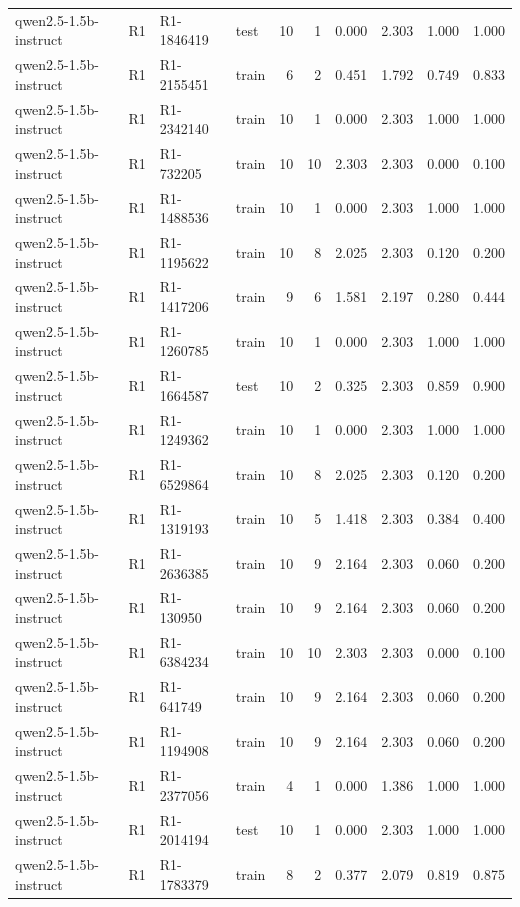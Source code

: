 \begin{table}
\begin{tabular}{llllrrrrrr}
qwen2.5-1.5b-instruct & R1 & R1-1846419 & test & 10 & 1 & 0.000 & 2.303 & 1.000 & 1.000 \\
qwen2.5-1.5b-instruct & R1 & R1-2155451 & train & 6 & 2 & 0.451 & 1.792 & 0.749 & 0.833 \\
qwen2.5-1.5b-instruct & R1 & R1-2342140 & train & 10 & 1 & 0.000 & 2.303 & 1.000 & 1.000 \\
qwen2.5-1.5b-instruct & R1 & R1-732205 & train & 10 & 10 & 2.303 & 2.303 & 0.000 & 0.100 \\
qwen2.5-1.5b-instruct & R1 & R1-1488536 & train & 10 & 1 & 0.000 & 2.303 & 1.000 & 1.000 \\
qwen2.5-1.5b-instruct & R1 & R1-1195622 & train & 10 & 8 & 2.025 & 2.303 & 0.120 & 0.200 \\
qwen2.5-1.5b-instruct & R1 & R1-1417206 & train & 9 & 6 & 1.581 & 2.197 & 0.280 & 0.444 \\
qwen2.5-1.5b-instruct & R1 & R1-1260785 & train & 10 & 1 & 0.000 & 2.303 & 1.000 & 1.000 \\
qwen2.5-1.5b-instruct & R1 & R1-1664587 & test & 10 & 2 & 0.325 & 2.303 & 0.859 & 0.900 \\
qwen2.5-1.5b-instruct & R1 & R1-1249362 & train & 10 & 1 & 0.000 & 2.303 & 1.000 & 1.000 \\
qwen2.5-1.5b-instruct & R1 & R1-6529864 & train & 10 & 8 & 2.025 & 2.303 & 0.120 & 0.200 \\
qwen2.5-1.5b-instruct & R1 & R1-1319193 & train & 10 & 5 & 1.418 & 2.303 & 0.384 & 0.400 \\
qwen2.5-1.5b-instruct & R1 & R1-2636385 & train & 10 & 9 & 2.164 & 2.303 & 0.060 & 0.200 \\
qwen2.5-1.5b-instruct & R1 & R1-130950 & train & 10 & 9 & 2.164 & 2.303 & 0.060 & 0.200 \\
qwen2.5-1.5b-instruct & R1 & R1-6384234 & train & 10 & 10 & 2.303 & 2.303 & 0.000 & 0.100 \\
qwen2.5-1.5b-instruct & R1 & R1-641749 & train & 10 & 9 & 2.164 & 2.303 & 0.060 & 0.200 \\
qwen2.5-1.5b-instruct & R1 & R1-1194908 & train & 10 & 9 & 2.164 & 2.303 & 0.060 & 0.200 \\
qwen2.5-1.5b-instruct & R1 & R1-2377056 & train & 4 & 1 & 0.000 & 1.386 & 1.000 & 1.000 \\
qwen2.5-1.5b-instruct & R1 & R1-2014194 & test & 10 & 1 & 0.000 & 2.303 & 1.000 & 1.000 \\
qwen2.5-1.5b-instruct & R1 & R1-1783379 & train & 8 & 2 & 0.377 & 2.079 & 0.819 & 0.875 \\

\end{tabular}
\end{table}
